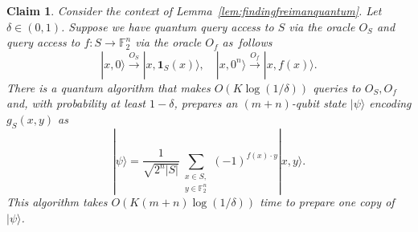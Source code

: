\documentclass[11pt]{amsart}
\newcommand{\F}{\mathbb{F}} %
\newcommand{\one}{\mathbf{1}}
\newcommand{\ket}[1]{|#1\rangle}
\theoremstyle{plain}
\newtheorem{claim}[theorem]{Claim}
\theoremstyle{definition}
\theoremstyle{remark}
\begin{document}
\begin{claim}\label{claim:prep_psi}
Consider the context of Lemma~\ref{lem:findingfreimanquantum}. Let $\delta \in (0,1)$. Suppose we have quantum query access to $S$ via the oracle $O_S$ and query access to  $f: S \rightarrow \F_2^n$ via the oracle $O_f$ as~follows
$$
\ket{x,0} \stackrel{O_S}\longrightarrow \ket{x,\one_S(x)}, \quad \ket{x,0^n} \stackrel{O_f}\longrightarrow \ket{x,f(x)}.
$$
There is a quantum algorithm that makes $O(K \log(1/\delta))$ queries to $O_S, O_f$ and, with probability at least $1-\delta$, prepares an $(m+n)$-qubit state $\ket{\psi}$ encoding $g_S(x,y)$ as
$$
\ket{\psi}= \frac{1}{\sqrt{2^n |S|}}\sum_{\substack{x\in S,\\y\in \F_2^n}}(-1)^{f(x)\cdot y}\ket{x,y}.
$$
This algorithm takes $O(K (m+n) \log(1/\delta))$ time to prepare one copy of $\ket{\psi}$.
\end{claim}
\end{document}
